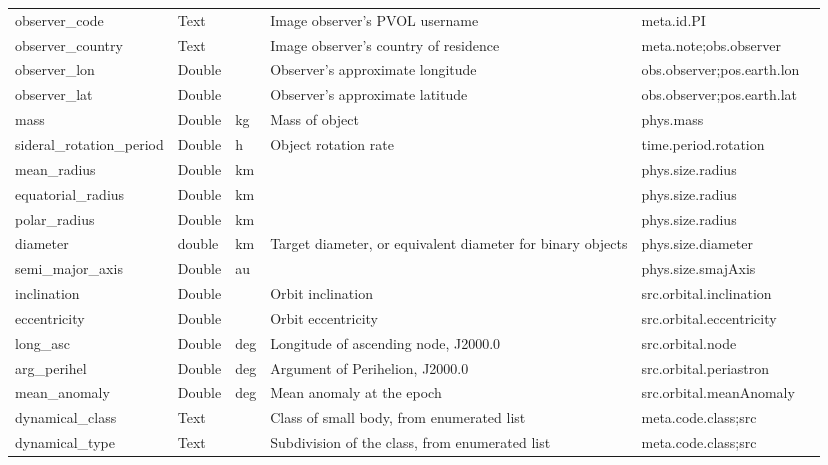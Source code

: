 \documentclass[11pt,a4paper]{ivoa}
\begin{document}
\begin{landscape}
\begin{longtable}{p{3.5cm}p{0.5cm}p{1.4cm}p{1cm}p{7cm}p{5cm}}
observer\_code&Text&&Image observer's PVOL username&meta.id.PI&\\

observer\_country&Text&&Image observer's country of residence&meta.note;obs.observer&\\

observer\_lon&Double&&Observer's approximate longitude&obs.observer;pos.earth.lon&\\

observer\_lat&Double&&Observer's approximate latitude&obs.observer;pos.earth.lat&\\

mass&Double&kg&Mass of object&phys.mass&\\

sideral\_rotation\_period&Double&h&Object rotation rate&time.period.rotation&\\

mean\_radius&Double&km&&phys.size.radius&\\

equatorial\_radius&Double&km&&phys.size.radius&\\

polar\_radius&Double&km&&phys.size.radius&\\

diameter&double&km&Target diameter, or equivalent diameter for binary objects&phys.size.diameter&\\

semi\_major\_axis&Double&au&&phys.size.smajAxis&\\

inclination&Double&&Orbit inclination&src.orbital.inclination&\\

eccentricity&Double&&Orbit eccentricity&src.orbital.eccentricity&\\

long\_asc&Double&deg&Longitude of ascending node, J2000.0&src.orbital.node&\\

arg\_perihel&Double&deg&Argument of Perihelion, J2000.0&src.orbital.periastron&\\

mean\_anomaly&Double&deg&Mean anomaly at the epoch&src.orbital.meanAnomaly&\\

dynamical\_class&Text&&Class of small body, from enumerated list&meta.code.class;src&\\

dynamical\_type&Text&&Subdivision of the class, from enumerated list&meta.code.class;src&\\


\end{longtable}
\end{landscape}
\end{document}
